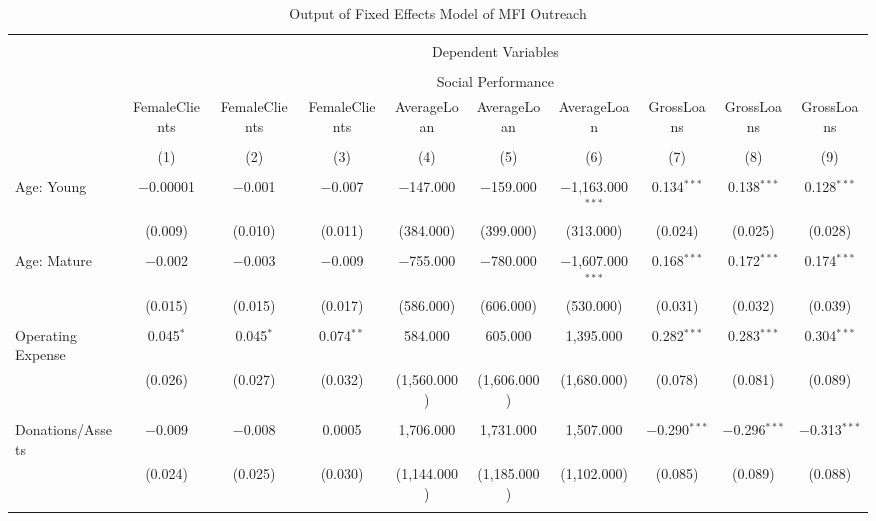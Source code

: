 \documentclass[a4paper, nobind]{templates/ociamthesis}
\begin{document}
\begin{landscape}

\begin{table}[!htbp] \centering 
  \caption{Output of Fixed Effects Model of MFI Outreach} 
  \label{} 
\tiny 
\begin{tabular}{@{\extracolsep{5pt}}lccccccccc} 
\\[-1.8ex]\hline 
\hline \\[-1.8ex] 
 & \multicolumn{9}{c}{Dependent Variables} \\ 
\cline{2-10} 
\\[-1.8ex] & \multicolumn{9}{c}{Social Performance} \\ 
 & FemaleClients & FemaleClients & FemaleClients & AverageLoan & AverageLoan & AverageLoan & GrossLoans & GrossLoans & GrossLoans \\ 
\\[-1.8ex] & (1) & (2) & (3) & (4) & (5) & (6) & (7) & (8) & (9)\\ 
\hline \\[-1.8ex] 
 Age: Young & $-$0.00001 & $-$0.001 & $-$0.007 & $-$147.000 & $-$159.000 & $-$1,163.000$^{***}$ & 0.134$^{***}$ & 0.138$^{***}$ & 0.128$^{***}$ \\ 
  & (0.009) & (0.010) & (0.011) & (384.000) & (399.000) & (313.000) & (0.024) & (0.025) & (0.028) \\ 
  & & & & & & & & & \\ 
 Age: Mature & $-$0.002 & $-$0.003 & $-$0.009 & $-$755.000 & $-$780.000 & $-$1,607.000$^{***}$ & 0.168$^{***}$ & 0.172$^{***}$ & 0.174$^{***}$ \\ 
  & (0.015) & (0.015) & (0.017) & (586.000) & (606.000) & (530.000) & (0.031) & (0.032) & (0.039) \\ 
  & & & & & & & & & \\ 
 Operating Expense & 0.045$^{*}$ & 0.045$^{*}$ & 0.074$^{**}$ & 584.000 & 605.000 & 1,395.000 & 0.282$^{***}$ & 0.283$^{***}$ & 0.304$^{***}$ \\ 
  & (0.026) & (0.027) & (0.032) & (1,560.000) & (1,606.000) & (1,680.000) & (0.078) & (0.081) & (0.089) \\ 
  & & & & & & & & & \\ 
 Donations/Assets & $-$0.009 & $-$0.008 & 0.0005 & 1,706.000 & 1,731.000 & 1,507.000 & $-$0.290$^{***}$ & $-$0.296$^{***}$ & $-$0.313$^{***}$ \\ 
  & (0.024) & (0.025) & (0.030) & (1,144.000) & (1,185.000) & (1,102.000) & (0.085) & (0.089) & (0.088) \\ 
  & & & & & & & & & \\ 

\end{tabular}
\end{table}
\end{landscape}
\end{document}
